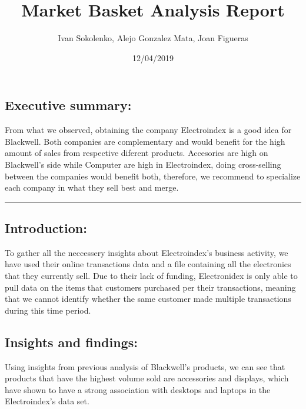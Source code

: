 \documentclass[]{article}
\title{Market Basket Analysis Report}
\author{Ivan Sokolenko, Alejo Gonzalez Mata, Joan Figueras}
\date{12/04/2019}
\begin{document}
\maketitle

{
\setcounter{tocdepth}{4}
\tableofcontents
}
\subsection{Executive summary:}\label{executive-summary}

From what we observed, obtaining the company Electroindex is a good idea
for Blackwell. Both companies are complementary and would benefit for
the high amount of sales from respective diferent products. Accesories
are high on Blackwell's side while Computer are high in Electroindex,
doing cross-selling between the companies would benefit both, therefore,
we recommend to specialize each company in what they sell best and
merge.

\begin{center}\rule{0.5\linewidth}{\linethickness}\end{center}

\subsection{Introduction:}\label{introduction}

To gather all the neccessery insights about Electroindex's business
activity, we have used their online transactions data and a file
containing all the electronics that they currently sell. Due to their
lack of funding, Electronidex is only able to pull data on the items
that customers purchased per their transactions, meaning that we cannot
identify whether the same customer made multiple transactions during
this time period.

\subsection{Insights and findings:}\label{insights-and-findings}

Using insights from previous analysis of Blackwell's products, we can
see that products that have the highest volume sold are accessories and
displays, which have shown to have a strong association with desktops
and laptops in the Electroindex's data set.
\end{document}
